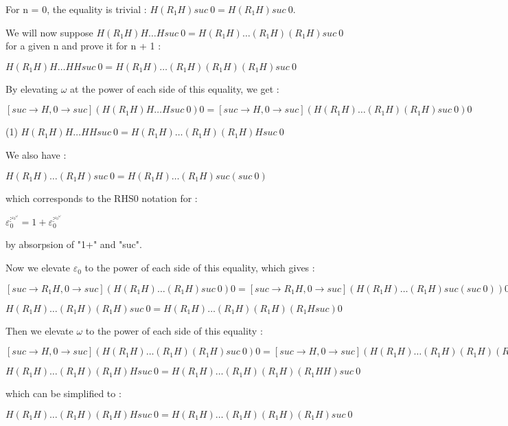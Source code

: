 \documentclass[10pt]{article}
\begin{document}
\bigskip

For n = 0, the equality is trivial : \( H (R_1 H) suc\ 0 = H (R_1 H) suc\ 0 \).

\bigskip

We will now suppose \( H (R_1 H) H \ldots H suc\ 0 = H (R_1 H) \ldots (R_1 H) (R_1 H) suc\ 0 \) for a given n and prove it for n + 1 :

\( H (R_1 H) H \ldots H H suc\ 0 = H (R_1 H) \ldots (R_1 H) (R_1 H) (R_1 H) suc\ 0  \)

\bigskip

By elevating \( \omega \) at the power of each side of this equality, we get : 

\( [suc \rightarrow H, 0 \rightarrow suc] (H (R_1 H) H \ldots H suc\ 0) 0 = [suc \rightarrow H, 0 \rightarrow suc] (H (R_1 H) \ldots (R_1 H) (R_1 H) suc\ 0) 0 \)

(1) \( H (R_1 H) H \ldots H H suc\ 0 = H (R_1 H) \ldots (R_1 H) (R_1 H) H suc\ 0 \)

\bigskip

We also have :

\( H (R_1 H) \ldots (R_1 H) suc\ 0 = H (R_1 H) \ldots (R_1 H) suc (suc\ 0) \)

which corresponds to the RHS0 notation for :

\( \varepsilon_0^{\vdots^{{\varepsilon_0}^\omega}} = 1 + \varepsilon_0^{\vdots^{{\varepsilon_0}^\omega}} \)

by absorpsion of "1+" and "suc".

Now we elevate \( \varepsilon_0 \) to the power of each side of this equality, which gives :

\( [suc \rightarrow R_1 H, 0 \rightarrow suc] (H (R_1 H) \ldots (R_1 H) suc\ 0) 0 = [suc \rightarrow R_1 H, 0 \rightarrow suc] (H (R_1 H) \ldots (R_1 H) suc (suc\ 0)) 0 \)

\( H (R_1 H) \ldots (R_1 H) (R_1 H) suc\ 0 = H (R_1 H) \ldots (R_1 H) (R_1 H) (R_1 H suc) 0 \)

Then we elevate \( \omega \) to the power of each side of this equality :

\( [suc \rightarrow H, 0 \rightarrow suc] (H (R_1 H) \ldots (R_1 H) (R_1 H) suc\ 0) 0 = [suc \rightarrow H, 0 \rightarrow suc] (H (R_1 H) \ldots (R_1 H) (R_1 H) (R_1 H suc) 0) 0 \)

\( H (R_1 H) \ldots (R_1 H) (R_1 H) H suc\ 0 = H (R_1 H) \ldots (R_1 H) (R_1 H) (R_1 H H) suc\ 0 \)

which can be simplified to :

\( H (R_1 H) \ldots (R_1 H) (R_1 H) H suc\ 0 = H (R_1 H) \ldots (R_1 H) (R_1 H) (R_1 H) suc\ 0 \)
\end{document}
